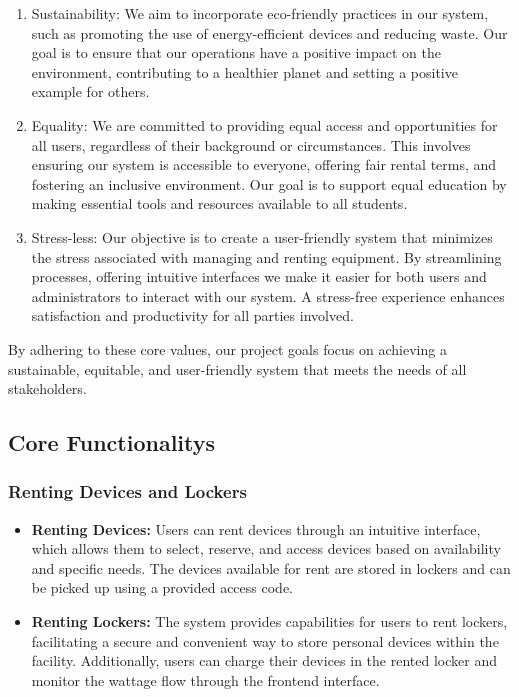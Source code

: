 \begin{enumerate}
\item Sustainability: We aim to incorporate eco-friendly practices in our system, such as promoting the use of energy-efficient devices and reducing waste. Our goal is to ensure that our operations have a positive impact on the environment, contributing to a healthier planet and setting a positive example for others.
\item Equality: We are committed to providing equal access and opportunities for all users, regardless of their background or circumstances. This involves ensuring our system is accessible to everyone, offering fair rental terms, and fostering an inclusive environment. Our goal is to support equal education by making essential tools and resources available to all students.

\item Stress-less: Our objective is to create a user-friendly system that minimizes the stress associated with managing and renting equipment. By streamlining processes, offering intuitive interfaces we make it easier for both users and administrators to interact with our system. A stress-free experience enhances satisfaction and productivity for all parties involved.
\end{enumerate}

By adhering to these core values, our project goals focus on achieving a sustainable, equitable, and user-friendly system that meets the needs of all stakeholders.

\subsection{Core Functionalitys}
\subsubsection{Renting Devices and Lockers}
\begin{itemize}
\item \textbf{Renting Devices:} Users can rent devices through an intuitive interface, which allows them to select, reserve, and access devices based on availability and specific needs. The devices available for rent are stored in lockers and can be picked up using a provided access code.
\item \textbf{Renting Lockers:}  The system provides capabilities for users to rent lockers, facilitating a secure and convenient way to store personal devices within the facility. Additionally, users can charge their devices in the rented locker and monitor the wattage flow through the frontend interface.
\end{itemize}

